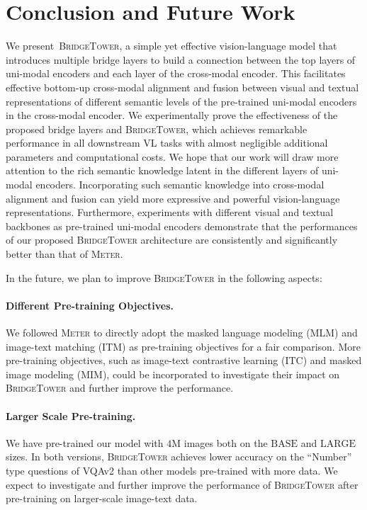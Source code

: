 \documentclass[letterpaper]{article} %
\newcommand{\methodname}[0]{\textsc{BridgeTower}}
\newcommand{\metername}[0]{\textsc{Meter}}
\begin{document}
\section{Conclusion and Future Work}
\label{sec:conclusion}
We present~\methodname{}, a simple yet effective vision-language model that introduces multiple bridge layers to build a connection between the top layers of uni-modal encoders and each layer of the cross-modal encoder.
This facilitates effective bottom-up cross-modal alignment and fusion between visual and textual representations of different semantic levels of the pre-trained uni-modal encoders in the cross-modal encoder.
We experimentally prove the effectiveness of the proposed bridge layers and \methodname{}, which achieves remarkable performance in all downstream VL tasks with almost negligible additional parameters and computational costs.
We hope that our work will draw more attention to the rich semantic knowledge latent in the different layers of uni-modal encoders.
Incorporating such semantic knowledge into cross-modal alignment and fusion can yield more expressive and powerful vision-language representations.
Furthermore, experiments with different visual and textual backbones as pre-trained uni-modal encoders demonstrate that the performances of our proposed \methodname{} architecture are consistently and significantly better than that of \metername{}.

In the future, we plan to improve \methodname{} in the following aspects:
\paragraph{Different Pre-training Objectives.}
We followed \metername{} to directly adopt the masked language modeling (MLM) and image-text matching (ITM) as pre-training objectives for a fair comparison. More pre-training objectives, such as image-text contrastive learning (ITC) and masked image modeling (MIM), could be incorporated to investigate their impact on \methodname{} and further improve the performance.
\paragraph{Larger Scale Pre-training.} 
We have pre-trained our model with $4$M images both on the $\text{BASE}$ and $\text{LARGE}$ sizes. 
In both versions, \methodname{} achieves lower accuracy on the ``Number'' type questions of VQAv2 than other models pre-trained with more data. 
We expect to investigate and further improve the performance of \methodname{} after pre-training on larger-scale image-text data.
\end{document}
